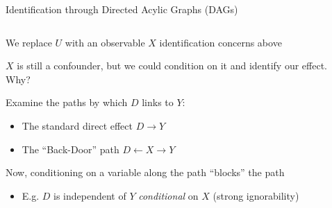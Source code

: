 \documentclass[notes,11pt, aspectratio=169]{beamer}
\newenvironment{wideitemize}{\itemize\addtolength{\itemsep}{10pt}}{\enditemize}
\begin{document}
\begin{frame}{Identification through Directed Acylic Graphs (DAGs)}
\begin{columns}[T] %
  \begin{column}{.6\textwidth}
    \begin{wideitemize}
    \item We replace $U$ with an observable $X$
      identification concerns above
    \item $X$ is still a confounder, but we could condition on it and
      identify our effect. Why?
    \item Examine the paths by which $D$ links to $Y$:
      \begin{itemize}
      \item The standard direct effect $D \rightarrow Y$
      \item The ``Back-Door'' path $D \leftarrow X \rightarrow Y$
      \end{itemize}
    \item Now, conditioning on a variable along the path
      ``blocks'' the path
      \begin{itemize}
      \item E.g. $D$ is independent of $Y$ \emph{conditional} on $X$ (strong ignorability)
      \end{itemize}
    \end{wideitemize}
  \end{column}%
  \hfill%
  \begin{column}{.5\textwidth}
    \begin{center}
    \end{center}
  \end{column}
\end{columns}
\end{frame}
\end{document}
